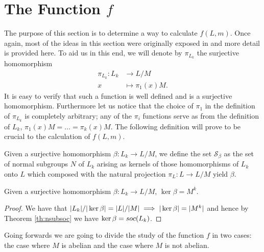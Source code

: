 \chapter{The Function \texorpdfstring{$f$}{f}}

The purpose of this section is to determine a way to calculate $f(L,m)$. Once again, most of the ideas in this section were originally exposed in \cite{DallaVoltaFGNMGAPQ} and more detail is provided here.
To aid us in this end, we will denote by $\pi_{L_k}$ the surjective homomorphism
\begin{align*}
    \pi_{L_k} \colon L_k &\rightarrow L/M \\
                        x &\mapsto \pi_1(x)M.
\end{align*}
It is easy to verify that such a function is well defined and is a surjective homomorphism. Furthermore let us notice that the choice of $\pi_1$ in the definition of $\pi_{L_k}$ is completely arbitrary; any of the $\pi_i$ functions serve as from the definition of $L_k$, 
$\pi_1(x)M = \ldots  = \pi_k(x)M$.
The following definition will prove to be crucial to the calculation of $f(L,m)$.
\begin{definition}
    Given a surjective homomorphism $\beta \colon L_k \rightarrow L/M$, we define the set $\mathscr{S}_\beta$ as the set of normal subgroups $N$ of $L_k$ arising as kernels of those homomorphisms of $L_k$ onto $L$ which composed with the natural projection $\pi_L \colon L \rightarrow L/M$ yield $\beta$.
\end{definition}

\begin{theorem}
    \label{S4:kerbeta}
    Given a surjective homomorphism $\beta \colon L_k \rightarrow L/M$, $\ker \beta = M^k$.
\end{theorem}

\begin{proof}
    We have that $| L_k |/| \ker \beta | = | L |/| M | \implies | \ker \beta | = | M^k |$ and hence by Theorem \ref{th:nsubsoc} we have $\ker \beta = soc {(L_k)}$.
\end{proof}

Going forwards we are going to divide the study of the function $f$ in two cases: the case where $M$ is abelian and the case where $M$ is not abelian.




